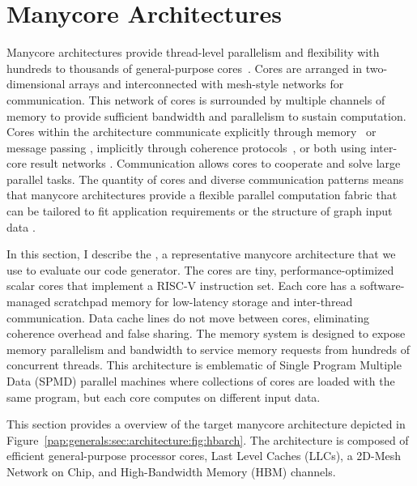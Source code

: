 
\section{Manycore Architectures} \label{pap:generals:sec:architecture}
\manycoreArchFigure

Manycore architectures provide thread-level parallelism and flexibility with hundreds to thousands of general-purpose cores~\cite{ramey2011tilera, davidson2018celerity, gwennap2011adapteva, agathos2015parallela, taylor2004raw}.
Cores are arranged in two-dimensional arrays and interconnected with mesh-style networks for communication.
This network of cores is surrounded by multiple channels of memory to provide sufficient bandwidth and parallelism to sustain computation.
Cores within the architecture communicate explicitly through memory~\cite{davidson2018celerity} or message passing \cite{gwennap2011adapteva}, implicitly through coherence protocols~\cite{ramey2011tilera}, or both using inter-core result networks \cite{taylor2004raw}.
Communication allows cores to cooperate and solve large parallel tasks.
The quantity of cores and diverse communication patterns means that manycore architectures provide a flexible parallel computation fabric that can be tailored to fit application requirements or the structure of graph input data \cite{lumsdaine2007challenges}.

In this section, I describe the \hbmc, a representative manycore architecture that we use to evaluate our code generator.
The cores are tiny, performance-optimized scalar cores that implement a RISC-V instruction set.
Each core has a software-managed scratchpad memory for low-latency storage and inter-thread communication.
Data cache lines do not move between cores, eliminating coherence overhead and false sharing.
The memory system is designed to expose memory parallelism and bandwidth to service memory requests from hundreds of concurrent threads.
This architecture is emblematic of Single Program Multiple Data (SPMD) parallel machines where collections of cores are loaded with the same program, but each core computes on different input data.

This section provides a overview of the target manycore
architecture depicted in
Figure~\ref{pap:generals:sec:architecture:fig:hbarch}. The
architecture is composed of efficient general-purpose processor cores,
Last Level Caches (LLCs), a 2D-Mesh Network on Chip, and High-Bandwidth
Memory (HBM) channels.



